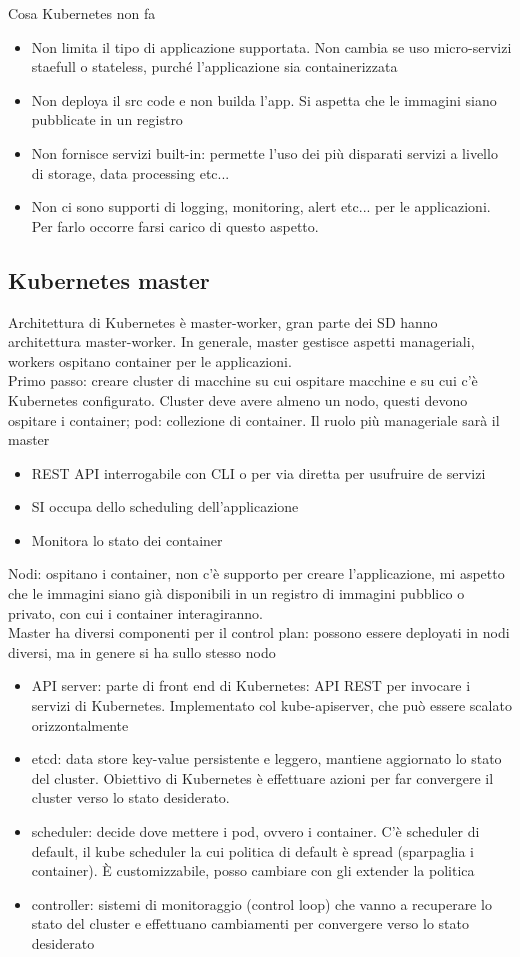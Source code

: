 \documentclass[16px]{article}
\begin{document}
Cosa Kubernetes non fa
\begin{itemize}
\item Non limita il tipo di applicazione supportata. Non cambia se uso micro-servizi staefull o stateless, purché l'applicazione sia containerizzata
\item Non deploya il src code e non builda l'app. Si aspetta che le immagini siano pubblicate in un registro
\item Non fornisce servizi built-in: permette l'uso dei più disparati servizi a livello di storage, data processing etc... 
\item Non ci sono supporti di logging, monitoring, alert etc... per le applicazioni. Per farlo occorre farsi carico di questo aspetto.
\end{itemize}
\subsection{Kubernetes master}
Architettura di Kubernetes è master-worker, gran parte dei SD hanno architettura master-worker. In generale, master gestisce aspetti manageriali, workers ospitano container per le applicazioni.\\ Primo passo: creare cluster di macchine su cui ospitare macchine e su cui c'è Kubernetes configurato. Cluster deve avere almeno un nodo, questi devono ospitare i container; pod: collezione di container. Il ruolo più manageriale sarà il master
\begin{itemize}
\item REST API interrogabile con CLI o per via diretta per usufruire de servizi
\item SI occupa dello scheduling dell'applicazione
\item Monitora lo stato dei container
\end{itemize}
Nodi: ospitano i container, non c'è supporto per creare l'applicazione, mi aspetto che le immagini siano già disponibili in un registro di immagini pubblico o privato, con cui i container interagiranno.\\ Master ha diversi componenti per il control plan: possono essere deployati in nodi diversi, ma in genere si ha sullo stesso nodo
\begin{itemize}
\item API server: parte di front end di Kubernetes: API REST per invocare i servizi di Kubernetes. Implementato col kube-apiserver, che può essere scalato orizzontalmente
\item etcd: data store key-value persistente e leggero, mantiene aggiornato lo stato del cluster. Obiettivo di Kubernetes è effettuare azioni per far convergere il cluster verso lo stato desiderato.
\item scheduler: decide dove mettere i pod, ovvero i container. C'è scheduler di default, il kube scheduler la cui politica di default è spread (sparpaglia i container). È customizzabile, posso cambiare con gli extender la politica
\item controller: sistemi di monitoraggio (control loop) che vanno a recuperare lo stato del cluster e effettuano cambiamenti per convergere verso lo stato desiderato
\end{itemize}
\end{document}
